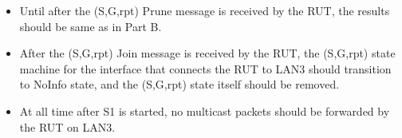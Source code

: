 \documentclass[11pt]{report}
\begin{document}

\begin{itemize}

  \item Until after the (S,G,rpt) Prune message is received by the RUT, the
  results should be same as in Part B.

  \item After the (S,G,rpt) Join message is received by the RUT,
  the (S,G,rpt) state machine for the interface that connects the RUT to
  LAN3 should transition to NoInfo state, and the (S,G,rpt) state itself
  should be removed.

  \item At all time after S1 is started, no multicast packets should be
  forwarded by the RUT on LAN3.

\end{itemize}

\end{document}

